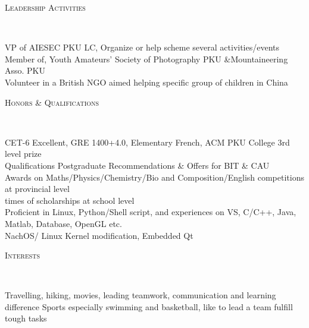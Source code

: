 \documentclass[10pt,a4paper]{article}
\newenvironment{changemargin}[2]{%
  \begin{list}{}{%
    \setlength{\topsep}{0pt}%
    \setlength{\leftmargin}{#1}%
    \setlength{\rightmargin}{#2}%
    \setlength{\listparindent}{\parindent}%
    \setlength{\itemindent}{\parindent}%
    \setlength{\parsep}{\parskip}%
  }%
  \item[]}{\end{list}
}
\newcommand{\lineover}{
	\begin{changemargin}{-0.05in}{-0.05in}
		\vspace*{-8pt}
		\hrulefill \\
		\vspace*{-2pt}
	\end{changemargin}
}
\newcommand{\header}[1]{
	\begin{changemargin}{-0.5in}{-0.5in}
		\scshape{#1}\\
  	\lineover
	\end{changemargin}
}
\newenvironment{body} {
	\vspace*{-16pt}
	\begin{changemargin}{-0.25in}{-0.5in}
  }	
	{\end{changemargin}
}
\begin{document}
\header{Leadership Activities}

\begin{body}
	\vspace{14pt}
	VP of AIESEC PKU LC, Organize or help scheme several activities/events \\
	Member of, Youth Amateurs' Society of Photography PKU \&Mountaineering Asso. PKU \\
	Volunteer in a British NGO aimed helping specific group of children in China\\
\end{body}

\smallskip


\header{Honors \& Qualifications}

\begin{body}
	\vspace{14pt}
	CET-6 Excellent, GRE 1400+4.0, Elementary French, ACM PKU College 3rd level prize \\
	Qualifications	Postgraduate Recommendations \& Offers for BIT \& CAU \\
	Awards on Maths/Physics/Chemistry/Bio and Composition/English competitions at provincial level \\
	times of scholarships at school level \\
	Proficient in Linux, Python/Shell script, and experiences on VS, C/C++, Java, Matlab, Database, OpenGL etc. \\ NachOS/ Linux Kernel modification, Embedded Qt 
\end{body}

\header{Interests}
\begin{body}
	\vspace{14pt}
	Travelling, hiking, movies, leading teamwork, communication and learning difference
	Sports especially swimming and basketball, like to lead a team fulfill tough tasks
\end{body}
\end{document}
